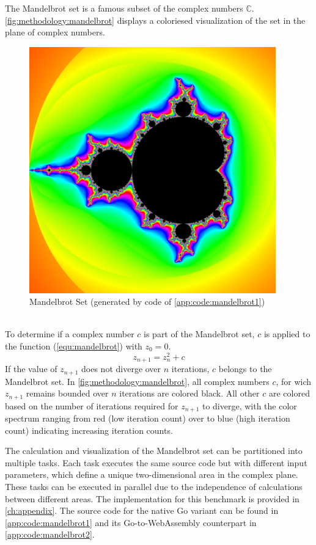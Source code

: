 The Mandelbrot set is a famous subset of the complex numbers $\mathbb{C}$. \autoref{fig:methodology:mandelbrot} displays a coloriesed visualization of the set in the plane of complex numbers.
\clearpage
\begin{figure}[htbp]
  \centering
  \includegraphics[width=0.95\textwidth]{gfx/figures/mandelbrot.png}
  \caption{Mandelbrot Set (generated by code of \ref{app:code:mandelbrot1})}
  \label{fig:methodology:mandelbrot}
\end{figure}
~\\
To determine if a complex number $c$ is part of the Mandelbrot set, $c$ is applied to the function (\ref{equ:mandelbrot}) with $z_{0}=0$.
\begin{equation}
  z_{n+1} = z_{n}^2 + c
  \label{equ:mandelbrot}
\end{equation}
If the value of $z_{n+1}$ does not diverge over $n$ iterations, $c$ belongs to the Mandelbrot set. In \autoref{fig:methodology:mandelbrot}, all complex numbers $c$, for wich $z_{n+1}$ remains bounded over $n$ iterations are colored black. All other $c$ are colored based on the number of iterations required for $z_{n+1}$ to diverge, with the color spectrum ranging from red (low iteration count) over to blue (high iteration count) indicating increasing iteration counts.

The calculation and visualization of the Mandelbrot set can be partitioned into multiple tasks. Each task executes the same source code but with different input parameters, which define a unique two-dimensional area in the complex plane. These tasks can be executed in parallel due to the independence of calculations between different areas. The implementation for this benchmark is provided in \autoref{ch:appendix}. The source code for the native Go variant can be found in \autoref{app:code:mandelbrot1} and its Go-to-WebAssembly counterpart in \autoref{app:code:mandelbrot2}.
